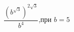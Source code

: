 \begin{ex}[type=calculate_expression]
	\begin{condition}
		\( \dfrac{(b^{\sqrt{3}})^{2\sqrt{3}}}{b^4} \),\quad при \( b=5 \)
	\end{condition}
\end{ex}